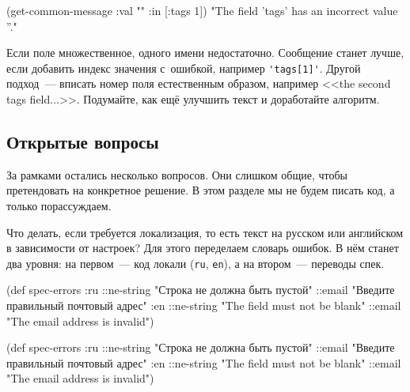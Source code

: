 \else

\begin{english}
  \begin{clojure}
(get-common-message {:val "" :in [:tags 1]})
"The field 'tags' has an incorrect value ''."
  \end{clojure}
\end{english}

\fi

Если поле множественное, одного имени недостаточно. Сообщение станет лучше, если
добавить индекс значения с~ошибкой, например \verb|'tags[1]'|. Другой подход~---
вписать номер поля естественным образом, например <<the second tags
field...>>. Подумайте, как ещё улучшить текст и доработайте алгоритм.

\subsection{Открытые вопросы}

За рамками остались несколько вопросов. Они слишком общие, чтобы претендовать на
конкретное решение. В этом разделе мы не будем писать код, а только
порассуждаем.

Что делать, если требуется локализация, то есть текст на русском или английском
в зависимости от настроек? Для этого переделаем словарь ошибок. В нём станет два
уровня: на первом~--- код локали (\verb|ru|, \verb|en|), а на втором~---
переводы спек.

\ifx\DEVICETYPE\MOBILE

  \begin{clojure}
(def spec-errors
  {:ru {::ne-string "Строка не должна быть пустой"
        ::email "Введите правильный почтовый адрес"}
   :en {::ne-string "The field must not be blank"
        ::email "The email address is invalid"}})
  \end{clojure}

\else

  \begin{clojure}
(def spec-errors
  {:ru {::ne-string "Строка не должна быть пустой"
        ::email "Введите правильный почтовый адрес"}
   :en {::ne-string "The field must not be blank"
        ::email "The email address is invalid"}})
  \end{clojure}

